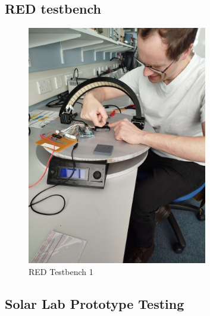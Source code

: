 \subsection{RED testbench}
\begin{figure}[htbp]
    \centering
    \includegraphics[width=0.7\textwidth]{figures/methodology/The_Arch/building_the_setup.jpg}
    \caption*{RED Testbench 1} 
    \label{fig:RED-Testbench1}
    \end{figure}

\subsection{Solar Lab Prototype Testing}


